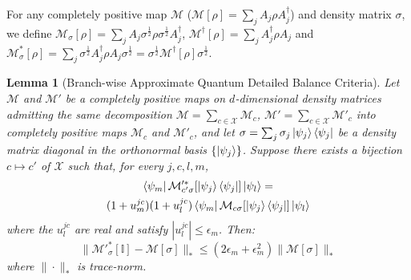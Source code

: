 \documentclass[aps,floatfix,10pt,amssymb,amsfont,amsmath,superscriptaddress,float,nofootinbib,longbibliography,nobalancelastpage,twocolumn]{revtex4-2}
\newtheorem{lemma}{Lemma}
\begin{document}
For any completely positive map $\mathcal{M}$ ($\mathcal{M}[\rho] =\sum_{j}  A_{j}\rho  A^{\dagger}_{j}$) and density matrix $\sigma$, we define $\mathcal{M}_{\sigma}[\rho] =\sum_{j}  A_{j}\sigma^{\frac{1}{2}}\rho\sigma^{\frac{1}{2}}  A^{\dagger}_{j}$, $\mathcal{M}^{\dagger}[\rho] = \sum_j A^{\dagger}_j \rho A_j$ and $ \mathcal{M}^*_{\sigma}[\rho] = \sum_{j} \sigma^{\frac{1}{2}}A^{\dagger}_{j}\rho A_{j}\sigma^{\frac{1}{2}} = \sigma^{\frac{1}{2}}\mathcal{M}^{\dagger}[\rho]\sigma^{\frac{1}{2}}$.
\begin{lemma}[Branch-wise Approximate Quantum Detailed Balance Criteria]
\label{lemma:1}
Let $\mathcal{M}$ and $\mathcal{M'}$ be a completely positive maps on $d$-dimensional density matrices admitting the same decomposition $\mathcal{M} = \sum_{c\in\mathcal{X}} \mathcal{M}_c$, $\mathcal{M'} = \sum_{c\in\mathcal{X}} \mathcal{M'}_c$ into completely positive maps $\mathcal{M}_c$ and $\mathcal{M}'_c$, and let $\sigma = \sum_j \sigma_j \ket{\psi_j}\bra{\psi_j}$ be a density matrix diagonal in the orthonormal basis $\{\ket{\psi_j}\}$. Suppose there exists a bijection $c \mapsto c'$ of $\mathcal{X}$ such that, for every $j,c,l,m$,
\begin{multline}
    \bra{\psi_m}\mathcal{M}'^*_{c'\sigma}[\ket{\psi_j}\bra{\psi_j}]\ket{\psi_l}
    =\\(1+u^{jc}_m)(1+ u^{jc}_l)
    \bra{\psi_m}\mathcal{M}_{c\sigma}[\ket{\psi_j}\bra{\psi_j}]\ket{\psi_l}
    \label{eq:approximate_quantum_detailed_balance_condition}
\end{multline}
where the $u^{jc}_l$ are real and satisfy $|u^{jc}_l| \leq \epsilon_m$. Then:
 \begin{equation}
    \|\mathcal{M}'^*_{\sigma}[\mathbb{I}]-\mathcal{M}[\sigma] \|_* \leq (2\epsilon_m+\epsilon_m^2)\|\mathcal{M}[\sigma]\|_* \label{eq:lemma2output}
\end{equation}
where $\|\cdot\|_*$ is trace-norm.
\end{lemma}
\end{document}

